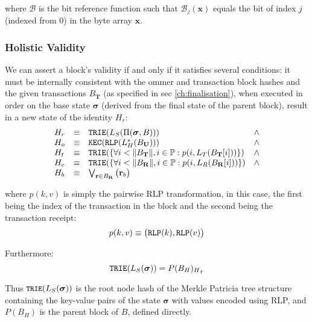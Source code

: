 \documentclass[9pt,oneside]{amsart}
\begin{document}
\begin{multicols}{2}
where $\mathcal{B}$ is the bit reference function such that $\mathcal{B}_j(\mathbf{x})$ equals the bit of index $j$ (indexed from 0) in the byte array $\mathbf{x}$.

\subsubsection{Holistic Validity}

We can assert a block's validity if and only if it satisfies several conditions: it must be internally consistent with the ommer and transaction block hashes and the given transactions $B_\mathbf{T}$ (as specified in sec \ref{ch:finalisation}), when executed in order on the base state $\boldsymbol{\sigma}$ (derived from the final state of the parent block), result in a new state of the identity $H_r$:
\begin{equation}
\begin{array}[t]{lclc}
H_r &\equiv& \mathtt{\small TRIE}(L_S(\Pi(\boldsymbol{\sigma}, B))) & \wedge \\
H_o &\equiv& \mathtt{\small KEC}(\mathtt{\small RLP}(L_H^*(B_\mathbf{U}))) & \wedge \\
H_t &\equiv& \mathtt{\small TRIE}(\{\forall i < \lVert B_\mathbf{T} \rVert, i \in \mathbb{P}: p(i, L_T(B_\mathbf{T}[i]))\}) & \wedge \\
H_e &\equiv& \mathtt{\small TRIE}(\{\forall i < \lVert B_\mathbf{R} \rVert, i \in \mathbb{P}: p(i, L_R(B_\mathbf{R}[i]))\}) & \wedge \\
H_b &\equiv& \bigvee_{\mathbf{r} \in B_\mathbf{R}} \big( \mathbf{r}_b \big)
\end{array}
\end{equation}

where $p(k, v)$ is simply the pairwise RLP transformation, in this case, the first being the index of the transaction in the block and the second being the transaction receipt:
\begin{equation}
p(k, v) \equiv \big( \mathtt{\small RLP}(k), \mathtt{\small RLP}(v) \big)
\end{equation}

Furthermore:
\begin{equation}
\mathtt{\small TRIE}(L_S(\boldsymbol{\sigma})) = {P(B_H)_H}_r
\end{equation}

Thus $\texttt{\small TRIE}(L_S(\boldsymbol{\sigma}))$ is the root node hash of the Merkle Patricia tree structure containing the key-value pairs of the state $\boldsymbol{\sigma}$ with values encoded using RLP, and $P(B_H)$ is the parent block of $B$, defined directly.


\end{multicols}
\end{document}
